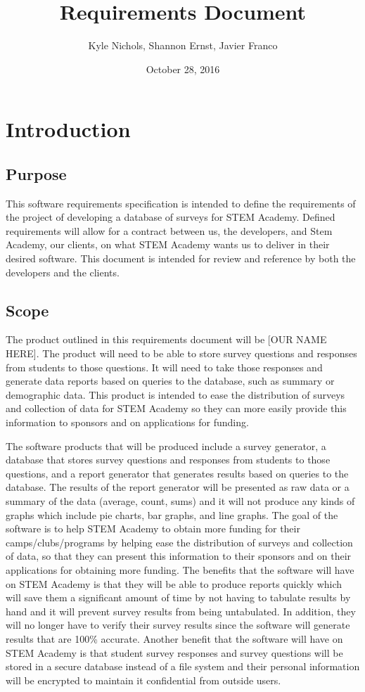 \documentclass[letterpaper,10pt,titlepage, draftclsnofoot,onecolumn]{IEEEtran}
\begin{document}
\title{Requirements Document}
\author{Kyle Nichols, Shannon Ernst, Javier Franco}
\date{October 28, 2016}
\maketitle
\section{Introduction}
\subsection{Purpose}
This software requirements specification is intended to define the requirements of the project of developing a database 
of surveys for STEM Academy. Defined requirements will allow for a contract between us, the developers, and Stem Academy, 
our clients, on what STEM Academy wants us to deliver in their desired software. This document is intended for review and
reference by both the developers and the clients.
\subsection{Scope}
The product outlined in this requirements document will be [OUR NAME HERE]. The product will need to be able to store survey
questions and responses from students to those questions. It will need to take those responses and generate data reports
based on queries to the database, such as summary or demographic data. This product is intended to ease the distribution of
surveys and collection of data for STEM Academy so they can more easily provide this information to sponsors and on
applications for funding. %

The software products that will be produced include a survey generator, a database that stores survey questions and responses from students to those questions, and a report generator that generates results based on queries to the database.  
The results of the report generator will be presented as raw data or a summary of the data (average, count, sums) and it will not produce any kinds of graphs which include pie charts, bar graphs, and line graphs.  
The goal of the software is to help STEM Academy to obtain more funding for their camps/clubs/programs by helping ease the distribution of surveys and collection of data, so that they can present this information to their sponsors and on their applications for obtaining more funding. 
The benefits that the software will have on STEM Academy is that they will be able to produce reports quickly which will save them a significant amount of time by not having to tabulate results by hand and it will prevent survey results from being untabulated.
 In addition, they will no longer have to verify their survey results since the software will generate results that are 100\% accurate.
 Another benefit that the software will have on STEM Academy is that student survey responses and survey questions will be stored in a secure database instead of a file system and their personal information will be encrypted to maintain it confidential from outside users. 
\end{document}
